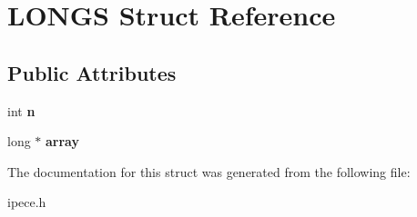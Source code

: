 \hypertarget{struct_l_o_n_g_s}{\section{L\-O\-N\-G\-S Struct Reference}
\label{struct_l_o_n_g_s}
}
\subsection*{Public Attributes}
\begin{DoxyCompactItemize}
\item 
\hypertarget{struct_l_o_n_g_s_a954df03da2205fbe2e08d2d32bf76c93}{int {\bfseries n}}\label{struct_l_o_n_g_s_a954df03da2205fbe2e08d2d32bf76c93}

\item 
\hypertarget{struct_l_o_n_g_s_abc7eb951eeb00e39ae2e7136c7a4cc63}{long $\ast$ {\bfseries array}}\label{struct_l_o_n_g_s_abc7eb951eeb00e39ae2e7136c7a4cc63}

\end{DoxyCompactItemize}


The documentation for this struct was generated from the following file\-:\begin{DoxyCompactItemize}
\item 
ipece.\-h\end{DoxyCompactItemize}
